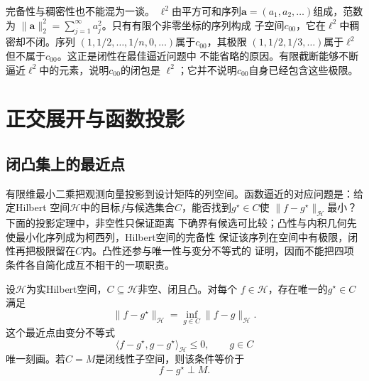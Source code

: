 完备性与稠密性也不能混为一谈。
$\ell^2$由平方可和序列$\bm{a}=(a_1,a_2,\ldots)$组成，范数为
$\lVert\bm{a}\rVert_2^2=\sum_{j=1}^{\infty}a_j^2$。只有有限个非零坐标的序列构成
子空间$c_{00}$，它在$\ell^2$中稠密却不闭。序列
$(1,1/2,\ldots,1/n,0,\ldots)$属于$c_{00}$，其极限
$(1,1/2,1/3,\ldots)$属于$\ell^2$但不属于$c_{00}$。这正是闭性在最佳逼近问题中
不能省略的原因。有限截断能够不断逼近$\ell^2$中的元素，说明$c_{00}$的闭包是
$\ell^2$；它并不说明$c_{00}$自身已经包含这些极限。

\section{正交展开与函数投影}
\label{sec:functional-orthogonal-expansions-projections}

\subsection{闭凸集上的最近点}

有限维最小二乘把观测向量投影到设计矩阵的列空间。函数逼近的对应问题是：给定Hilbert
空间$\mathcal{H}$中的目标$f$与候选集合$C$，能否找到$g^\star\in C$使
$\lVert f-g^\star\rVert_{\mathcal{H}}$最小？下面的投影定理中，非空性只保证距离
下确界有候选可比较；凸性与内积几何先使最小化序列成为柯西列，Hilbert空间的完备性
保证该序列在空间中有极限，闭性再把极限留在$C$内。凸性还参与唯一性与变分不等式的
证明，因而不能把四项条件各自简化成互不相干的一项职责。

\begin{theorem}[Hilbert空间投影定理]
\label{thm:functional-hilbert-projection}
设$\mathcal{H}$为实Hilbert空间，$C\subseteq\mathcal{H}$非空、闭且凸。对每个
$f\in\mathcal{H}$，存在唯一的$g^\star\in C$满足
\[
  \lVert f-g^\star\rVert_{\mathcal{H}}
  =\inf_{g\in C}\lVert f-g\rVert_{\mathcal{H}}.
\]
这个最近点由变分不等式
\begin{equation}
  \langle f-g^\star,g-g^\star\rangle_{\mathcal{H}}
  \leq0,\qquad g\in C
  \label{eq:functional-convex-projection-characterization}
\end{equation}
唯一刻画。若$C=M$是闭线性子空间，则该条件等价于
\begin{equation}
  f-g^\star\perp M.
  \label{eq:functional-subspace-projection-orthogonality}
\end{equation}
\end{theorem}

